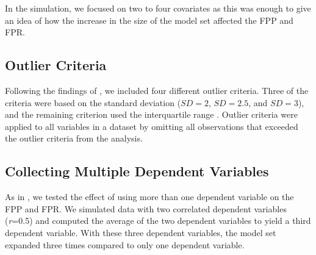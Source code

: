 


In the simulation, we focused on two to four covariates as this was enough to give an idea of how the increase in the size of the model set affected the FPP and FPR. 

\subsection{Outlier Criteria}
Following the findings of \cite{Leyes2013}, we included four different outlier criteria. Three of the criteria were based on the standard deviation ($SD = 2$, $SD = 2.5$, and $SD = 3$), and the remaining criterion used the interquartile range \citep{Rousseeuw2011}. Outlier criteria were applied to all variables in a dataset by omitting all observations that exceeded the outlier criteria from the analysis.

\subsection{Collecting Multiple Dependent Variables}
As in \cite{Simmons2011}, we tested the effect of using more than one dependent variable on the FPP and FPR. We simulated data with two correlated dependent variables (\textit{r}=0.5) and computed the average of the two dependent variables to yield a third dependent variable. With these three dependent variables, the model set expanded three times compared to only one dependent variable. 

